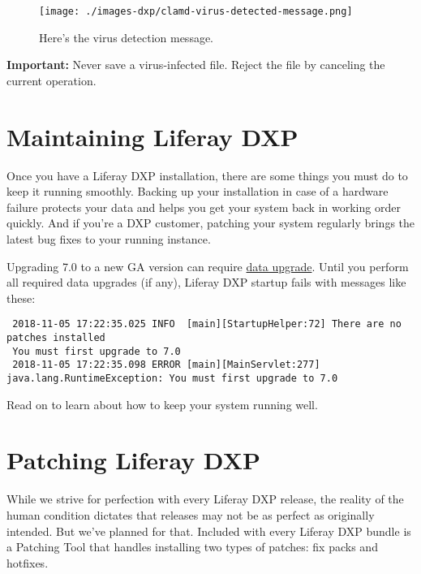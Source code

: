 \begin{figure}
\centering
\texttt{[image: ./images-dxp/clamd-virus-detected-message.png]}
\caption{Here's the virus detection message.}
\end{figure}

\textbf{Important:} Never save a virus-infected file. Reject the file by
canceling the current operation.

\chapter{Maintaining Liferay DXP}\label{maintaining-liferay-dxp}

Once you have a Liferay DXP installation, there are some things you must
do to keep it running smoothly. Backing up your installation in case of
a hardware failure protects your data and helps you get your system back
in working order quickly. And if you're a DXP customer, patching your
system regularly brings the latest bug fixes to your running instance.

\noindent\hrulefill

Upgrading 7.0 to a new GA version can require
\href{/docs/7-0/deploy/-/knowledge_base/d/upgrading-to-liferay-7}{data
upgrade}. Until you perform all required data upgrades (if any), Liferay
DXP startup fails with messages like these:

\begin{verbatim}
 2018-11-05 17:22:35.025 INFO  [main][StartupHelper:72] There are no patches installed
 You must first upgrade to 7.0
 2018-11-05 17:22:35.098 ERROR [main][MainServlet:277] java.lang.RuntimeException: You must first upgrade to 7.0
\end{verbatim}

\noindent\hrulefill

Read on to learn about how to keep your system running well.

\chapter{Patching Liferay DXP}\label{patching-liferay-dxp}

While we strive for perfection with every Liferay DXP release, the
reality of the human condition dictates that releases may not be as
perfect as originally intended. But we've planned for that. Included
with every Liferay DXP bundle is a Patching Tool that handles installing
two types of patches: fix packs and hotfixes.

\noindent\hrulefill

